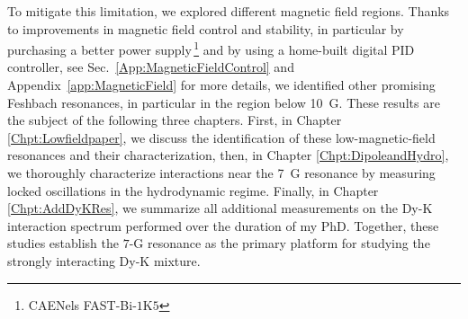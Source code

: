 To mitigate this limitation, we explored different magnetic field regions. Thanks to improvements in magnetic field control and stability, in particular by purchasing a better power supply\,\footnote{CAENels FAST-Bi-$1$K$5$} and by using a home-built digital \ac{PID} controller, see Sec.~\ref{App:MagneticFieldControl} and Appendix~\ref{app:MagneticField} 
for more details, we identified other promising Feshbach resonances, in particular in the region below \SI{10}{G}. These results are the subject of the following three chapters. First, in Chapter \ref{Chpt:Lowfieldpaper}, we discuss the identification of these low-magnetic-field resonances and their characterization, then, in Chapter \ref{Chpt:DipoleandHydro}, we thoroughly characterize interactions near the \SI{7}{G} resonance by measuring locked oscillations in the hydrodynamic regime. Finally, in Chapter \ref{Chpt:AddDyKRes}, we summarize all additional measurements on the Dy-K interaction spectrum performed over the duration of my PhD. Together, these studies establish the $7$-G resonance as the primary platform for studying the strongly interacting Dy-K mixture.



